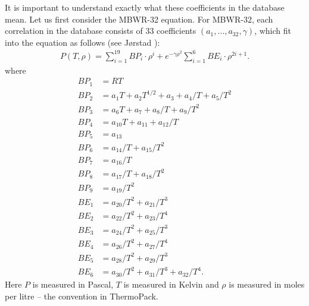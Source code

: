 \documentclass[english]{../thermomemo/thermomemo}
\numberwithin{equation}{section}
\begin{document}
It is important to understand exactly what these coefficients in the
database mean. Let us first consider the MBWR-32 equation. For
MBWR-32, each correlation in the database consists of 33 coefficients
$(a_1,\ldots,a_{32},\gamma)$, which fit into the equation as follows (see
J{\o}rstad \cite{Jorstad93}):
\begin{align*}
  P(T,\rho) = \sum_{i=1}^{19} BP_i \cdot \rho^i + e^{-\gamma \rho^2}
  \sum_{i=1}^{6} BE_i \cdot \rho^{2i+1}.
\end{align*}
where
\begin{equation}
  \label{eq:BPBE_MBWR32}
  \begin{aligned}
    BP_1 &= RT \\
    BP_2 &= a_1T+a_2T^{1/2}+a_3+a_4/T+a_5/T^2 \\
    BP_3 &= a_6T+a_7+a_8/T+a_9/T^2 \\
    BP_4 &= a_{10}T+a_{11}+a_{12}/T \\
    BP_5 &= a_{13} \\
    BP_6 &= a_{14}/T+a_{15}/T^2 \\
    BP_7 &= a_{16}/T \\
    BP_8 &= a_{17}/T+a_{18}/T^2 \\
    BP_9 &= a_{19}/T^2 \\
    BE_1 &= a_{20}/T^2+a_{21}/T^3 \\
    BE_2 &= a_{22}/T^2+a_{23}/T^4 \\
    BE_3 &= a_{24}/T^2+a_{25}/T^3 \\
    BE_4 &= a_{26}/T^2+a_{27}/T^4 \\
    BE_5 &= a_{28}/T^2+a_{29}/T^3 \\
    BE_6 &= a_{30}/T^2+a_{31}/T^3 + a_{32}/T^4.
  \end{aligned}
\end{equation}
Here $P$ is measured in Pascal, $T$ is
measured in Kelvin and $\rho$ is measured in moles per litre -- the
convention in ThermoPack.
\end{document}
